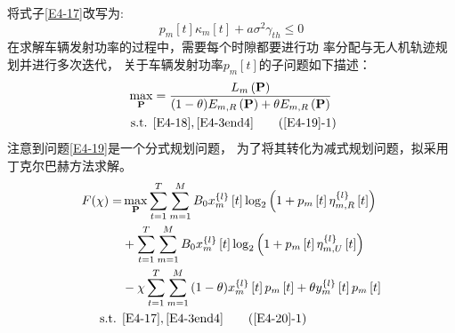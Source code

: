 将式子\eqref{E4-17}改写为: %
\begin{equation} \label{E4-18}
{{p}_{m}}\left[ t \right]{{\kappa }_{m}}\left[ t \right]+a{{\sigma }^{2}}{{\gamma }_{th}}\le 0
\end{equation}
在求解车辆发射功率的过程中，需要每个时隙都要进行功
率分配与无人机轨迹规划并进行多次迭代，
关于车辆发射功率$p_m\left[t\right]$的子问题如下描述：
\begin{align}  \label{E4-19}
\max _{ \mathbf{P}} &   ={\frac{{{L}_{m}}\left( \mathbf{P} \right)}
{(1-\theta){E}_{m,R}\left( \mathbf{P} \right)+\theta{E}_{m,R}\left( \mathbf{P} \right)}}        \\
\text { s.t. }
& \eqref{E4-18},\eqref{E4-3end4}                                                  \tag{\ref{E4-19}{-1}}      \label{E4-19-1}
\end{align}
注意到问题\eqref{E4-19}是一个分式规划问题，
为了将其转化为减式规划问题，拟采用丁克尔巴赫方法求解。
\begin{align} \notag
F(\chi)= & \max _{ \mathbf{P}} \sum_{t=1}^T \sum_{m=1}^M {B}_{0}x_{m}^{\left\{ l \right\}}\left[ t \right] %
\log_2{\left(1+p_m\left[t\right]\eta_{m,R}^{\left\{ l \right\}}\left[t\right]\right)}                         \\       \label{E4-20}
& + \sum_{t=1}^T \sum_{m=1}^M {B}_{0}x_{m}^{\left\{ l \right\}}\left[ t \right]
\log_2{\left(1+p_m\left[t\right]\eta_{m,U}^{\left\{ l \right\}}\left[t\right]\right)}                         \\ \notag
& -\chi \sum_{t=1}^T \sum_{m=1}^M{(1-\theta)x_{m}^{\left\{ l \right\}}\left[ t \right]p_m\left[t\right]
+\theta y_{m}^{\left\{ l \right\}}\left[ t \right]p_m\left[t\right]}                                          \\ \notag
\text { s.t. }
& \eqref{E4-17},\eqref{E4-3end4}                                                           \tag{\ref{E4-20}{-1}}       \label{E4-20-1}
\end{align}
